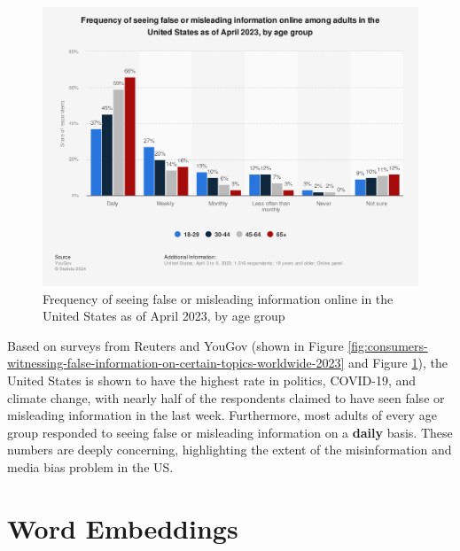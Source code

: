 \begin{figure}[htbp]
    \centering
    \includegraphics[width=0.9\linewidth]{images/statistic_id1462057_frequency-of-seeing-false-information-online-in-the-us-2023-by-age-group.png}
    \caption{Frequency of seeing false or misleading information online in the United States as of April 2023, by age group \cite{yougov-2023-frequency}}
    \label{fig:frequency-of-seeing-false-information-online-in-the-us-2023-by-age-group}
\end{figure}

Based on surveys from Reuters and YouGov (shown in Figure \ref{fig:consumers-witnessing-false-information-on-certain-topics-worldwide-2023} and Figure \ref{fig:frequency-of-seeing-false-information-online-in-the-us-2023-by-age-group}), the United States is shown to have the highest rate in politics, COVID-19, and climate change, with nearly half of the respondents claimed to have seen false or misleading information in the last week. Furthermore, most adults of every age group responded to seeing false or misleading information on a \textbf{daily} basis. These numbers are deeply concerning, highlighting the extent of the misinformation and media bias problem in the US.



\section{Word Embeddings}


